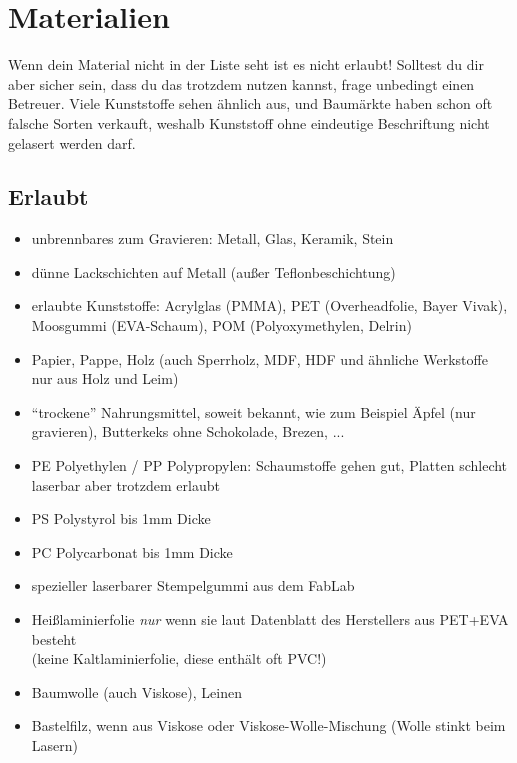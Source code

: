 \documentclass{\basedir/fablab-document}
\begin{document}
	\newpage %
	
	\section{Materialien}
	Wenn dein Material nicht in der Liste seht ist es nicht erlaubt! Solltest du dir aber sicher sein, dass du das trotzdem nutzen kannst, frage unbedingt einen Betreuer. Viele Kunststoffe sehen ähnlich aus, und Baumärkte haben schon oft falsche Sorten verkauft, weshalb Kunststoff ohne eindeutige Beschriftung nicht gelasert werden darf.
	
	\subsection{Erlaubt}
	\newcommand{\itemCheck}{\item[\checkmark]}
	\begin{itemize}
		\itemCheck unbrennbares zum Gravieren: Metall, Glas, Keramik, Stein
		\itemCheck dünne Lackschichten auf Metall (außer Teflonbeschichtung)
		\itemCheck erlaubte Kunststoffe: Acrylglas (PMMA), PET (Overheadfolie, Bayer Vivak), Moosgummi (EVA-Schaum), POM (Polyoxymethylen, Delrin)
		\itemCheck Papier, Pappe, Holz (auch Sperrholz, MDF, HDF und ähnliche Werkstoffe nur aus Holz und Leim)
		\itemCheck \enquote{trockene} Nahrungsmittel, soweit bekannt, wie zum Beispiel Äpfel (nur gravieren), Butterkeks ohne Schokolade, Brezen, ...
		\itemCheck PE Polyethylen / PP Polypropylen: Schaumstoffe gehen gut, Platten schlecht laserbar aber trotzdem erlaubt
		\itemCheck PS Polystyrol bis 1mm Dicke
		\itemCheck PC Polycarbonat bis 1mm Dicke
		\itemCheck spezieller laserbarer Stempelgummi aus dem FabLab
		\itemCheck Heißlaminierfolie \emph{nur} wenn sie laut Datenblatt des Herstellers aus PET+EVA besteht\\(keine Kaltlaminierfolie, diese enthält oft PVC!) 
		\itemCheck Baumwolle (auch Viskose), Leinen
		\itemCheck Bastelfilz, wenn aus Viskose oder Viskose-Wolle-Mischung (Wolle stinkt beim Lasern)
	\end{itemize}
	
	\newpage %
	
\end{document}
